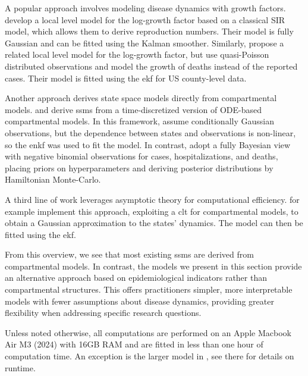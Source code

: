 A popular approach involves modeling disease dynamics with growth factors. \citep{Arroyo-Marioli2021Tracking} develop a local level model for the log-growth factor based on a classical SIR model, which allows them to derive reproduction numbers. Their model is fully Gaussian and can be fitted using the Kalman smoother. Similarly, \citet{Ives2021Estimating} propose a related local level model for the log-growth factor, but use quasi-Poisson distributed observations and model the growth of deaths instead of the reported cases. Their model is fitted using the \gls{ekf} for US county-level data.

Another approach derives state space models directly from compartmental models. \citep{Lal2021Application} and \citep{Keller2022Tracking} derive \glspl{ssm} from a time-discretized version of ODE-based compartmental models. In this framework, \citep{Lal2021Application} assume conditionally Gaussian observations, but the dependence between states and observations is non-linear, so the \gls{enkf} was used to fit the model. 
In contrast, \citep{Keller2022Tracking} adopt a fully Bayesian view with negative binomial observations for cases, hospitalizations, and deaths, placing priors on hyperparameters and deriving posterior distributions by Hamiltonian Monte-Carlo.

A third line of work leverages asymptotic theory for computational efficiency. \citep{ODea2022Semiparametric} for example implement this approach, exploiting a \gls{clt} for compartmental models, to obtain a Gaussian approximation to the states' dynamics. The model can then be fitted using the \gls{ekf}.

From this overview, we see that most existing \glspl{ssm} are derived from compartmental models. In contrast, the models we present in this section provide an alternative approach based on epidemiological indicators rather than compartmental structures. This offers practitioners simpler, more interpretable models with fewer assumptions about disease dynamics, providing greater flexibility when addressing specific research questions.

Unless noted otherwise, all computations are performed on an Apple Macbook Air M3 (2024) with 16GB RAM and are fitted in less than one hour of computation time. An exception is the larger model in , see there for details on runtime.


